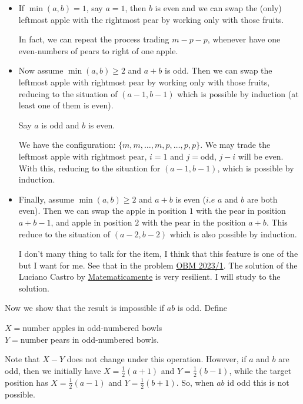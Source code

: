\documentclass[11pt]{scrartcl}
\begin{document}
\begin{soln}
\begin{itemize}
\item If $\min (a,b)=1$, say $a=1$, then $b$ is even  and we can swap the (only) leftmost apple with the rightmost
pear by working only with those fruits.

\begin{remark}
In fact, we can repeat the process trading $m - p - p$, whenever have one even-numbers of pears to right of one apple.
\end{remark}


\item Now assume $\min(a, b) \ge 2$ and $a + b$ is odd. Then we can swap the leftmost apple with rightmost pear by working
only with those fruits, reducing to the situation of $(a-1, b-1)$ which is possible by induction (at least one of
them is even).

\begin{remark}
Say $a$ is odd and $b$ is even.\par
We have the configuration: $\{m,m,\ldots,m,p,\ldots,p,p\}$. We may trade the leftmost apple with rightmost pear, $i=1$
and $j=$odd, $j-i$ will be even. With this, reducing to the situation for $(a-1,b-1)$, which is possible by induction.
\end{remark}

\item Finally, assume $\min(a,b) \ge 2$ and $a+b$ is even ($i.e$ $a$ and $b$ are both even). Then we can swap the apple in
position $1$ with the pear in position $a+b-1$, and apple in position $2$ with the pear in the position $a+b$.
This reduce to the situation of $(a-2,b-2)$ which is also possible by induction.

\begin{remark}
I don't many thing to talk for the item, I think that this feature is one of the but I want for me. See that in the
problem \href{https://artofproblemsolving.com/community/c6h3181582p28989993}{OBM 2023/1}. The solution of the Luciano
Castro by \href{https://www.youtube.com/watch?v=rPlnud-oexQ&t=4s}{Matematicamente} is very resilient. I will study
to the solution.


\end{remark}
\end{itemize}

Now we show that the result is impossible if $ab$ is odd. Define\par
\begin{center}
$X=$number apples in odd-numbered bowls\\
$Y=$number pears in odd-numbered bowls.
\end{center}

Note that $X-Y$ does not change under this operation. However, if $a$ and $b$  are odd, then we initially have
$X=\frac{1}{2}(a+1)$ and $Y=\frac{1}{2}(b-1)$, while the target position has $X=\frac{1}{2}(a-1)$ and
$Y=\frac{1}{2}(b+1)$. So, when $ab$ id odd this is not possible.

\end{soln}
\end{document}
